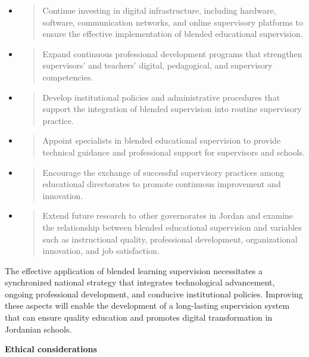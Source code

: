 \documentclass[10pt]{NSP1}
\begin{document}
\begin{itemize}
\item
  \begin{quote}
  Continue investing in digital infrastructure, including hardware, software, communication networks, and online supervisory platforms to ensure the effective implementation of blended educational supervision.
  \end{quote}
\item
  \begin{quote}
  Expand continuous professional development programs that strengthen supervisors' and teachers' digital, pedagogical, and supervisory competencies.
  \end{quote}
\item
  \begin{quote}
  Develop institutional policies and administrative procedures that support the integration of blended supervision into routine supervisory practice.
  \end{quote}
\item
  \begin{quote}
  Appoint specialists in blended educational supervision to provide technical guidance and professional support for supervisors and schools.
  \end{quote}
\item
  \begin{quote}
  Encourage the exchange of successful supervisory practices among educational directorates to promote continuous improvement and innovation.
  \end{quote}
\item
  \begin{quote}
  Extend future research to other governorates in Jordan and examine the relationship between blended educational supervision and variables such as instructional quality, professional development, organizational innovation, and job satisfaction.
  \end{quote}
\end{itemize}

The effective application of blended learning supervision necessitates a synchronized national strategy that integrates technological advancement, ongoing professional development, and conducive institutional policies. Improving these aspects will enable the development of a long-lasting supervision system that can ensure quality education and promotes digital transformation in Jordanian schools.

\textbf{Ethical considerations}
\end{document}
